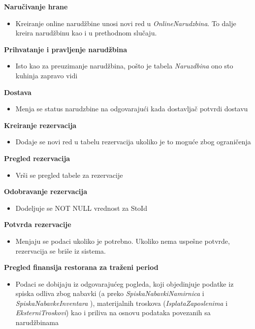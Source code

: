 \documentclass{article}
\begin{document}
\textbf{Naručivanje hrane}
\begin{itemize}
\item Kreiranje online narudžbine unosi novi red u \emph{OnlineNarudzbina}. To dalje kreira narudžbinu kao i u prethodnom slučaju.
\end{itemize}

\textbf{Prihvatanje i pravljenje narudžbina}
\begin{itemize}
\item Isto kao za preuzimanje narudžbina, pošto je tabela \emph{Naruzdbina} ono sto kuhinja zapravo vidi
\end{itemize}


\textbf{Dostava}
\begin{itemize}
\item Menja se status narudzbine na odgovarajući kada dostavljač potvrdi dostavu
\end{itemize}

\textbf{Kreiranje rezervacija}
\begin{itemize}
\item  Dodaje se novi red u tabelu rezervacija ukoliko je to moguće zbog ograničenja 
\end{itemize}


\textbf{Pregled rezervacija}
\begin{itemize}
\item Vrši se pregled tabele za rezervacije 
\end{itemize}


\textbf{Odobravanje rezervacija}
\begin{itemize}
\item Dodeljuje se NOT NULL vrednost za StoId 
\end{itemize}

\textbf{Potvrda rezervacije}
\begin{itemize}
\item Menjaju se podaci ukoliko je potrebno. Ukoliko nema uspešne potvrde, rezervacija se briše iz sistema.
\end{itemize}

\textbf{Pregled finansija restorana za traženi period}
\begin{itemize}
\item  Podaci se dobijaju iz odgovarajućeg pogleda, koji objedinjuje podatke iz spiska odliva zbog nabavki (a preko \emph{SpiskaNabavkiNamirnica} i \emph{SpiskaNabavkeInventara} ), materijalnih troskova (\emph{IsplataZaposlenima} i \emph{EksterniTroskovi}) kao i priliva na osnovu podataka povezanih sa narudžbinama 
\end{itemize}
\end{document}

